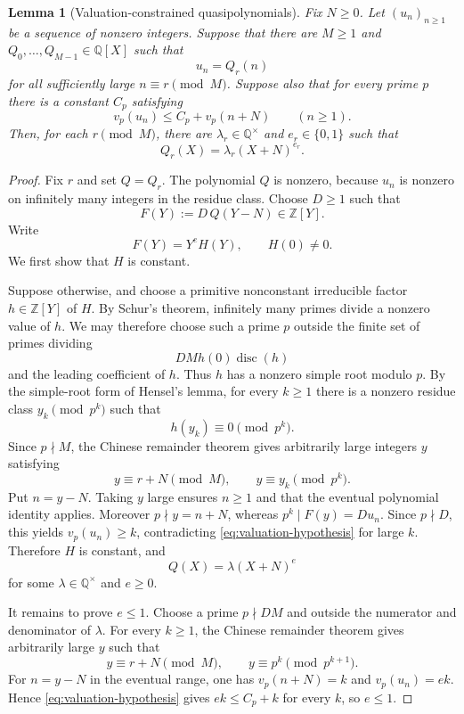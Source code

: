\documentclass[11pt]{amsart}
\newtheorem{lemma}[theorem]{Lemma}
\theoremstyle{remark}
\numberwithin{equation}{section}
\newcommand{\Z}{\mathbb Z}
\newcommand{\Q}{\mathbb Q}
\begin{document}
\begin{lemma}[Valuation-constrained quasipolynomials]\label{lem:local-polynomial}
Fix $N\ge 0$.  Let $(u_n)_{n\ge 1}$ be a sequence of nonzero integers.  Suppose
that there are $M\ge 1$ and $Q_0,\dots,Q_{M-1}\in\Q[X]$ such that
\[
  u_n=Q_r(n)
\]
for all sufficiently large $n\equiv r\pmod M$.  Suppose also that for every
prime $p$ there is a constant $C_p$ satisfying
\begin{equation}\label{eq:valuation-hypothesis}
  v_p(u_n)\le C_p+v_p(n+N)
  \qquad(n\ge 1).
\end{equation}
Then, for each $r\pmod M$, there are $\lambda_r\in\Q^\times$ and
$e_r\in\{0,1\}$ such that
\[
  Q_r(X)=\lambda_r(X+N)^{e_r}.
\]
\end{lemma}

\begin{proof}
Fix $r$ and set $Q=Q_r$.  The polynomial $Q$ is nonzero, because $u_n$ is
nonzero on infinitely many integers in the residue class.  Choose $D\ge 1$ such
that
\[
  F(Y):=D\,Q(Y-N)\in\Z[Y].
\]
Write
\[
  F(Y)=Y^e H(Y),
  \qquad H(0)\ne 0.
\]
We first show that $H$ is constant.

Suppose otherwise, and choose a primitive nonconstant irreducible factor
$h\in\Z[Y]$ of $H$.  By Schur's theorem, infinitely many primes divide a
nonzero value of $h$.  We may therefore choose such a prime $p$ outside the
finite set of primes dividing
\[
  D M h(0)\operatorname{disc}(h)
\]
and the leading coefficient of $h$.  Thus $h$ has a nonzero simple root modulo
$p$.  By the simple-root form of Hensel's lemma, for every $k\ge 1$ there is a
nonzero residue class $y_k\pmod{p^k}$ such that
\[
  h(y_k)\equiv 0\pmod{p^k}.
\]
Since $p\nmid M$, the Chinese remainder theorem gives arbitrarily large integers
$y$ satisfying
\[
  y\equiv r+N\pmod M,
  \qquad
  y\equiv y_k\pmod{p^k}.
\]
Put $n=y-N$.  Taking $y$ large ensures $n\ge 1$ and that the eventual polynomial
identity applies.  Moreover $p\nmid y=n+N$, whereas
$p^k\mid F(y)=D u_n$.  Since $p\nmid D$, this yields
$v_p(u_n)\ge k$, contradicting \eqref{eq:valuation-hypothesis} for large $k$.
Therefore $H$ is constant, and
\[
  Q(X)=\lambda(X+N)^e
\]
for some $\lambda\in\Q^\times$ and $e\ge 0$.

It remains to prove $e\le 1$.  Choose a prime $p\nmid DM$ and outside the
numerator and denominator of $\lambda$.  For every $k\ge 1$, the Chinese
remainder theorem gives arbitrarily large $y$ such that
\[
  y\equiv r+N\pmod M,
  \qquad
  y\equiv p^k\pmod{p^{k+1}}.
\]
For $n=y-N$ in the eventual range, one has $v_p(n+N)=k$ and
$v_p(u_n)=ek$.  Hence \eqref{eq:valuation-hypothesis} gives
$ek\le C_p+k$ for every $k$, so $e\le 1$.
\end{proof}
\end{document}
